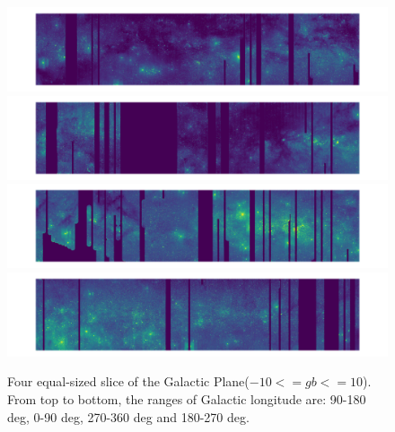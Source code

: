\documentclass[12pt, preprint]{aastex61}
\begin{document}
\begin{figure}[p]
\begin{center}
\includegraphics[width=1.\textwidth]{figures/cartview1}
\includegraphics[width=1.\textwidth]{figures/cartview2}
\includegraphics[width=1.\textwidth]{figures/cartview3}
\includegraphics[width=1.\textwidth]{figures/cartview4}
\end{center}
\caption{
  \label{map0}
  Four equal-sized slice of the Galactic Plane($-10<=gb<=10$).
  From top to bottom, the ranges of Galactic longitude are: 90-180 deg, 0-90 deg, 270-360 deg and 180-270 deg.
}
\end{figure}
\end{document}
